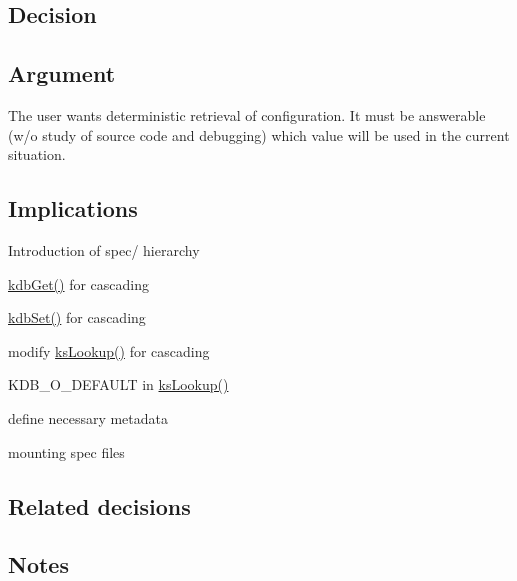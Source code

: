 \subsection*{Decision}

\subsection*{Argument}


\begin{DoxyItemize}
\item The user wants deterministic retrieval of configuration. It must be answerable (w/o study of source code and debugging) which value will be used in the current situation.
\end{DoxyItemize}

\subsection*{Implications}


\begin{DoxyEnumerate}
\item Introduction of spec/ hierarchy
\item \hyperlink{group__kdb_ga28e385fd9cb7ccfe0b2f1ed2f62453a1}{kdb\+Get()} for cascading
\item \hyperlink{group__kdb_ga11436b058408f83d303ca5e996832bcf}{kdb\+Set()} for cascading
\item modify \hyperlink{group__keyset_gaa34fc43a081e6b01e4120daa6c112004}{ks\+Lookup()} for cascading
\item K\+D\+B\+\_\+\+O\+\_\+\+D\+E\+F\+A\+U\+L\+T in \hyperlink{group__keyset_gaa34fc43a081e6b01e4120daa6c112004}{ks\+Lookup()}
\item define necessary metadata
\item mounting spec files
\end{DoxyEnumerate}

\subsection*{Related decisions}

\subsection*{Notes}